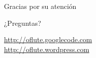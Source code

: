 {\begin{frame}{}
\begin{center}
      \bigskip
      \bigskip

      {\LARGE Gracias por su atención}\\

      \medskip

      {\large ¿Preguntas?}\\

      \bigskip
      \medskip

      {\large \url{http://oflute.googlecode.com} \\[0.3em] \url{http://oflute.wordpress.com}}
    \end{center}

  \end{frame}
}


